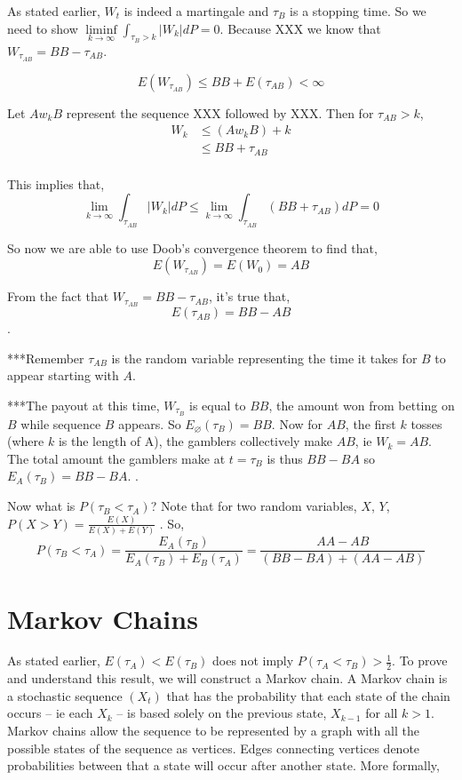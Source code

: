 \documentclass{article}
\numberwithin{mytheorem}{subsection} %
\begin{document}
			As stated earlier, $W_t$ is indeed a martingale and $\tau_B$ is a stopping time. So we need to show $\liminf\limits_{k\rightarrow \infty} \int_{\tau_B > k} |W_k|dP = 0$. Because XXX we know that $W_{\tau_{AB}} = BB - \tau_{AB}$.

			$$E(W_{\tau_{AB}}) \leq BB + E(\tau_{AB}) < \infty$$

			Let $Aw_k B$ represent the sequence XXX followed by XXX. Then for $\tau_{AB} > k$,
			\begin{equation}
			\begin{split}
			W_k & \leq (Aw_k B) + k \\
			    & \leq BB + \tau_{AB} \\
			\end{split}
			\end{equation}

			This implies that,
			$$\lim_{k\rightarrow \infty} \int_{\tau_{AB}} |W_k|dP \leq \lim_{k\rightarrow \infty} \int_{\tau_{AB}} (BB + \tau_{AB}) dP = 0$$

			So now we are able to use Doob's convergence theorem to find that,
			$$E(W_{\tau_{AB}}) = E(W_0) = AB$$

			From the fact that $W_{\tau_{AB}} = BB - \tau_{AB}$, it's true that,
			$$E(\tau_{AB}) = BB - AB$$.

			***Remember $\tau_{AB}$ is the random variable representing the time it takes for $B$ to appear starting with $A$.

			***The payout at this time, $W_{\tau_{B}}$ is equal to $BB$, the amount won from betting on $B$ while sequence $B$ appears. So $E_{\varnothing}(\tau_{B}) = BB$. Now for $AB$, the first $k$ tosses (where $k$ is the length of A), the gamblers collectively make $AB$, ie $W_k = AB$. The total amount the gamblers make at $t = \tau_{B}$ is thus $BB - BA$ so $E_A(\tau_{B}) = BB - BA$. \cite{grinstead}.

			Now what is $P(\tau_{B} < \tau_{A})$? Note that for two random variables, $X$, $Y$, $P(X > Y) = \frac{E(X)}{E(X) + E(Y)}$ \cite{grinstead}. So, $$P(\tau_{B} < \tau_{A}) = \frac{E_A(\tau_{B})}{E_A(\tau_{B}) + E_B(\tau_{A})} = \frac{AA - AB}{(BB - BA) + (AA - AB)}$$

	\section{Markov Chains}
		As stated earlier, $E(\tau_A) < E(\tau_B)$ does not imply $P(\tau_A < \tau_B) > \frac{1}{2}$. To prove and understand this result, we will construct a Markov chain. A Markov chain is a stochastic sequence $(X_t)$ that has the probability that each state of the chain occurs -- ie each $X_k$ -- is based solely on the previous state, $X_{k-1}$ for all $k > 1$. Markov chains allow the sequence to be represented by a graph with all the possible states of the sequence as vertices. Edges connecting vertices denote probabilities between that a state will occur after another state. More formally,
\end{document}
